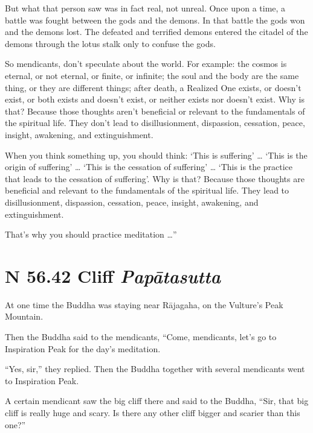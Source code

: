 \documentclass[12pt,openany]{book}%
\newcommand*{\suttatitleacronym}[1]{\smaller[2]{#1}\vspace*{.3em}}
\newcommand*{\suttatitletranslation}[1]{\linebreak{#1}}
\newcommand*{\suttatitleroot}[1]{\linebreak\smaller[2]\itshape{#1}}
\newcommand*{\tocacronym}[1]{\hspace*{-3.3em}{#1}\quad}
\newcommand*{\toctranslation}[1]{#1}
\newcommand*{\tocroot}[1]{(\textit{#1})}
\begin{document}
But what that person saw was in fact real, not unreal. Once upon a time, a battle was fought between the gods and the demons. In that battle the gods won and the demons lost. The defeated and terrified demons entered the citadel of the demons through the lotus stalk only to confuse the gods. 

So mendicants, don’t speculate about the world. For example: the cosmos is eternal, or not eternal, or finite, or infinite; the soul and the body are the same thing, or they are different things; after death, a Realized One exists, or doesn’t exist, or both exists and doesn’t exist, or neither exists nor doesn’t exist. Why is that? Because those thoughts aren’t beneficial or relevant to the fundamentals of the spiritual life. They don’t lead to disillusionment, dispassion, cessation, peace, insight, awakening, and extinguishment. 

When you think something up, you should think: ‘This is suffering’ … ‘This is the origin of suffering’ … ‘This is the cessation of suffering’ … ‘This is the practice that leads to the cessation of suffering’. Why is that? Because those thoughts are beneficial and relevant to the fundamentals of the spiritual life. They lead to disillusionment, dispassion, cessation, peace, insight, awakening, and extinguishment. 

That’s why you should practice meditation …” 

%
\section*{{\suttatitleacronym SN 56.42}{\suttatitletranslation A Cliff }{\suttatitleroot Papātasutta}}
\addcontentsline{toc}{section}{\tocacronym{SN 56.42} \toctranslation{A Cliff } \tocroot{Papātasutta}}

At one time the Buddha was staying near \textsanskrit{Rājagaha}, on the Vulture’s Peak Mountain. 

Then the Buddha said to the mendicants, “Come, mendicants, let’s go to Inspiration Peak for the day’s meditation. 

“Yes, sir,” they replied. Then the Buddha together with several mendicants went to Inspiration Peak. 

A certain mendicant saw the big cliff there and said to the Buddha, “Sir, that big cliff is really huge and scary. Is there any other cliff bigger and scarier than this one?” 
\end{document}
